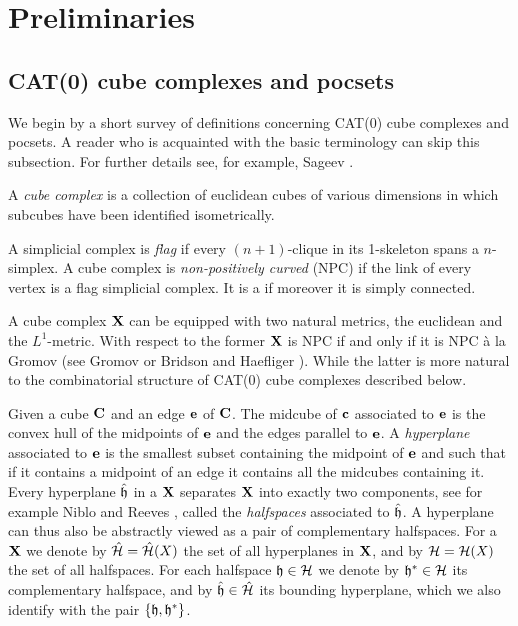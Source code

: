 \section{Preliminaries}


\subsection{CAT(0) cube complexes and pocsets}

We begin by a short survey of definitions concerning CAT(0) cube complexes and pocsets. A reader who is acquainted with the basic terminology can skip this subsection. For further details see, for example, Sageev \cite{Sag12}.

A \emph{cube complex} is a collection of euclidean cubes of various dimensions in which subcubes have been identified isometrically. 

A simplicial complex is \emph{flag} if every $(n+1)$-clique in its 1-skeleton spans a $n$-simplex.
A cube complex is \emph{non-positively curved} (NPC) if the link of every vertex is a flag simplicial complex. It is a \emph{\CCC} if moreover it is simply connected.

A cube complex $\mathbf{X}$ can be equipped with two natural metrics, the euclidean and the $L^1$-metric. With respect to the former $\mathbf{X}$ is NPC if and only if it is NPC \`{a} la Gromov (see Gromov \cite{Gro87} or Bridson and Haefliger \cite{BrHa99}). While the latter is more natural to the combinatorial structure of CAT(0) cube complexes described below.

Given a cube $\mathbf{C}$ and an edge $\mathbf{e}$ of $\mathbf{C}$. The midcube of $\mathbf{c}$ associated to $\mathbf{e}$ is the convex hull of the midpoints of $\mathbf{e}$ and the edges parallel to $\mathbf{e}$.
A \emph{hyperplane} associated to $\mathbf{e}$ is the smallest subset containing the midpoint of $\mathbf{e}$ and such that if it contains a midpoint of an edge it contains all the midcubes containing it.
Every hyperplane $\hat{\mathfrak{h}}$ in a \CCC $\mathbf{X}$ separates $\mathbf{X}$ into exactly two components, see for example Niblo and Reeves \cite{NiRe98}, called the \emph{halfspaces} associated to $\hat{\mathfrak{h}}$. A hyperplane can thus also be abstractly viewed as a pair of complementary halfspaces. 
For a \CCC $\mathbf{X}$ we denote by $\hat{\mathcal{H}}=\hat{\mathcal{H}}(X)$ the set of all hyperplanes in $\mathbf{X}$, and by $\mathcal{H}=\mathcal{H}(X)$ the set of all halfspaces. For each halfspace $\mathfrak{h}\in \mathcal{H}$ we denote by ${\mathfrak{h}}^*\in\mathcal{H}$ its complementary halfspace, and by $\hat{\mathfrak{h}}\in\hat{\mathcal{H}}$ its bounding hyperplane, which we also identify with the pair $\{\mathfrak{h},{\mathfrak{h}}^*\}$.

